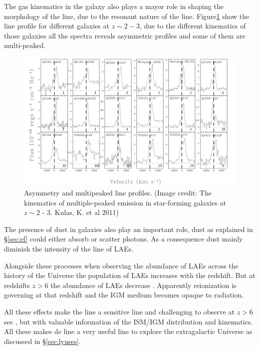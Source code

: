 The gas kinematics in the galaxy also plays a mayor role in shaping
the morphology of the line, due to the resonant nature of the line. 
Figure\ref{fig:kulas} show the \ly line
profile for different galaxies at $z \sim 2 - 3$, due to the different
kinematics of those galaxies all the spectra reveals asymmetric profiles 
and some of them are multi-peaked.    


\begin{figure}[H]%
\begin{center}
\includegraphics[scale=0.4]{Figures/kulas.png}
\end{center}\caption{Asymmetry and multipeaked \ly line profiles. (Image credit: The kinematics of multiple-peaked \ly emission in star-forming galaxies at $z\sim 2$ - 3. Kulas, K. et al 2011)\label{fig:kulas}
 }
\end{figure}

The presence of dust in galaxies also play an important role, dust as explained
 in \S\ref{sec:ef} could either absorb or scatter \ly photons. As a 
consequence dust mainly diminish the intensity of the \ly line of LAEs. 

Alongside these processes when observing the abundance of LAEs across
the history of the Universe the population of LAEs increases 
with the redshift. But at redshifts $z>6$ the  
abundance of LAEs decrease \citep{Schenker12}. Apparently 
 reionization  is governing at that redshift and the IGM medium 
becomes opaque to \ly radiation.   

All these effects make the \ly line a sensitive line and challenging
to observe at $z>6$ see \citep{Sobral15}, but with valuable information
of the ISM/IGM distribution and kinematics. All these makes de \ly
line a very useful line to explore the extragalactic Universe as
discussed in \S\ref{sec:lyuses}.


